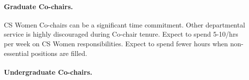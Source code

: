 \paragraph{Graduate Co-chairs.} CS Women Co-chairs can be a significant time commitment. Other departmental service is highly discouraged during Co-chair tenure. Expect to spend 5-10/hrs per week on CS Women responsibilities. Expect to spend fewer hours when non-essential positions are filled.


\paragraph{Undergraduate Co-chairs.}
